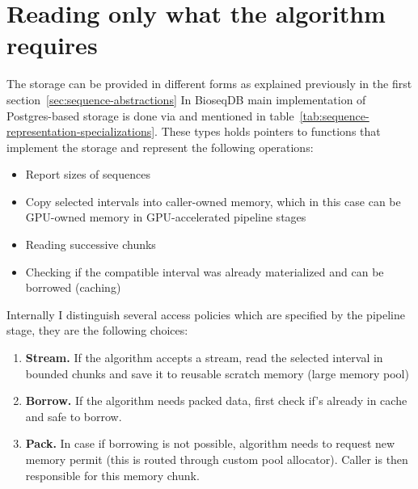 \section{Reading only what the algorithm requires}
\label{sec:lazy-sequence-facade}
\label{sec:sequence-materialization}

The storage can be provided in different forms as explained previously in the first section~\ref{sec:sequence-abstractions}
In BioseqDB main implementation of Postgres-based storage is done via  and  mentioned in table~\ref{tab:sequence-representation-specializations}.
These types holds pointers to functions that implement the storage and represent the following operations:
\begin{itemize}
  \item Report sizes of sequences
  \item Copy selected intervals into caller-owned memory, which in this case can be GPU-owned memory in GPU-accelerated pipeline stages
  \item Reading successive chunks
  \item Checking if the compatible interval was already materialized and can be borrowed (caching)
\end{itemize}
Internally I distinguish several access policies which are specified by the pipeline stage, they are the following choices:
\begin{enumerate}
  \item \textbf{Stream.} If the algorithm accepts a stream, read the selected
        interval in bounded chunks and save it to reusable scratch memory (large memory pool)
  \item \textbf{Borrow.} If the algorithm needs packed data, first check if's already in cache and safe to borrow.
  \item \textbf{Pack.} In case if borrowing is not possible, algorithm needs to request new memory permit (this is routed through custom pool allocator). Caller is then responsible for this memory chunk.
\end{enumerate}

